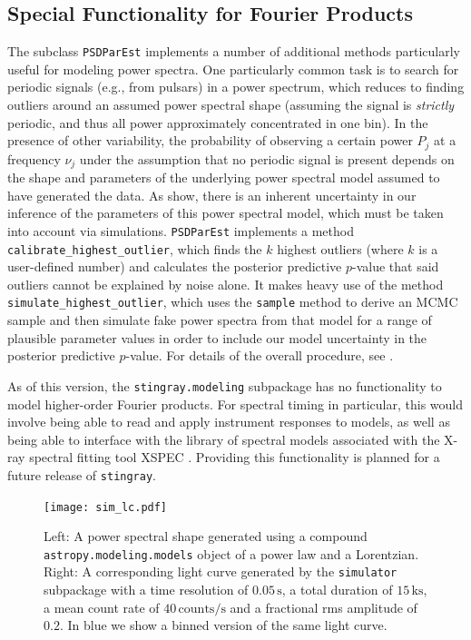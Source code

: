 \documentclass[twocolumn]{aastex62}
\newcommand{\stingray}{\texttt{stingray}\xspace}
\begin{document}
\subsection{Special Functionality for Fourier Products}

The subclass \verb|PSDParEst| implements a number of additional methods particularly useful for modeling power spectra. 
One particularly common task is to search for periodic signals (e.g., from pulsars) in a power spectrum, which reduces to finding outliers around an assumed power spectral shape (assuming the signal is \textit{strictly} periodic, and thus all power approximately concentrated in one bin). 
In the presence of other variability, the probability of observing a certain power $P_j$ at a frequency $\nu_j$ under the assumption that no periodic signal is present depends on the shape and parameters of the underlying power spectral model assumed to have generated the data. 
As \citet{vaughan2010} show, there is an inherent uncertainty in our inference of the parameters of this power spectral model, which must be taken into account via simulations. 
\verb|PSDParEst| implements a method \verb|calibrate_highest_outlier|, which finds the $k$ highest outliers (where $k$ is a user-defined number) and calculates the posterior predictive $p$-value that said outliers cannot be explained by noise alone. 
It makes heavy use of the method \verb|simulate_highest_outlier|, which uses the \verb|sample| method to derive an MCMC sample and then simulate fake power spectra from that model for a range of plausible parameter values in order to include our model uncertainty in the posterior predictive $p$-value. 
For details of the overall procedure, see \citet{vaughan2010}. 

As of this version, the \verb|stingray.modeling| subpackage has no functionality to model higher-order Fourier products. 
For spectral timing in particular, this would involve being able to read and apply instrument responses to models, as well as being able to interface with the library of spectral models associated with the X-ray spectral fitting tool XSPEC \citep{arnaud1996}. 
Providing this functionality is planned for a future release of \stingray. 

\begin{figure}[htbp]
\begin{center}
\texttt{[image: sim\_lc.pdf]}
\caption{Left: A power spectral shape generated using a compound \texttt{astropy.modeling.models} object of a power law and a Lorentzian. 
Right: A corresponding light curve generated by the \texttt{simulator} subpackage with a time resolution of $0.05\,\mathrm{s}$, a total duration of $15\,\mathrm{ks}$, a mean count rate of $40\,\mathrm{counts}/\mathrm{s}$ and a fractional rms amplitude of $0.2$. In blue we show a binned version of the same light curve.}
\label{fig:sim_lc}
\end{center}
\end{figure}
\end{document}
